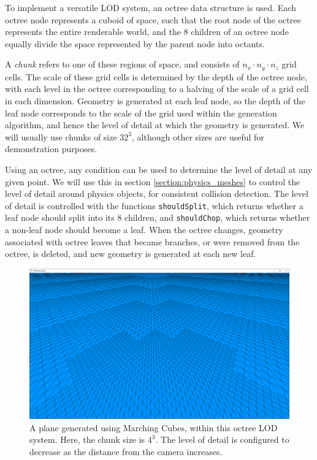 \documentclass[11pt]{article}
\begin{document}
To implement a versatile LOD system, an octree data structure is used. Each octree node represents a cuboid of space, such that the root node of the octree represents the entire renderable world, and the 8 children of an octree node equally divide the space represented by the parent node into octants. 

A \textit{chunk} refers to one of these regions of space, and consists of $n_x \cdot n_y \cdot n_z$ grid cells. The scale of these grid cells is determined by the depth of the octree node, with each level in the octree corresponding to a halving of the scale of a grid cell in each dimension. Geometry is generated at each leaf node, so the depth of the leaf node corresponds to the scale of the grid used within the generation algorithm, and hence the level of detail at which the geometry is generated. We will usually use chunks of size $32^3$, although other sizes are useful for demonstration purposes.

Using an octree, any condition can be used to determine the level of detail at any given point. We will use this in section \ref{section:physics_meshes} to control the level of detail around physics objects, for consistent collision detection. The level of detail is controlled with the functions \texttt{shouldSplit}, which returns whether a leaf node should split into its 8 children, and \texttt{shouldChop}, which returns whether a non-leaf node should become a leaf. When the octree changes, geometry associated with octree leaves that became branches, or were removed from the octree, is deleted, and new geometry is generated at each new leaf.

\begin{figure}[H]
  \begin{center}
  \includegraphics[width=\textwidth]{octree_plane.png}
  \end{center}
  \caption{A plane generated using Marching Cubes, within this octree LOD system. Here, the chunk size is $4^3$. The level of detail is configured to decrease as the distance from the camera increases.}
\end{figure}
\end{document}
